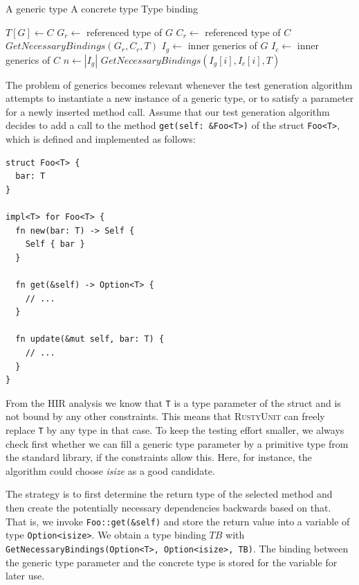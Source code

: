 \documentclass[paper=a4,%
  twoside,%
  BCOR4mm,%
  abstract=true,%
  toc=bibliography,%
  chapterprefix=true,%
  toc=bibliographynumbered,%
  open=right,%
  english,%
  pagesize=pdftex]{scrreprt}
\newcommand{\Desc}[2]{\State \makebox[2em][l]{#1}#2}
\newcommand{\tech}{\textsc{RustyUnit}\xspace}
\newcommand{\hir}{\ac{HIR}\xspace}
\begin{document}
\begin{algorithm}[t]
  \caption{$GetNecessaryBindings(G, C, T)$}\label{alg:get-necessary-bindings}
\begin{algorithmic}
\Input
  \Desc{$G$}{A generic type}
  \Desc{$C$}{A concrete type}
  \Desc{$T$}{Type binding}
\EndInput

\State $T[G] \gets C$
\Else
    \State $G_r \gets $ referenced type of $G$
    \State $C_r \gets $ referenced type of $C$
    \State $GetNecessaryBindings(G_r, C_r, T)$
  \Else
    \State $I_g \gets $ inner generics of $G$
    \State $I_c \gets $ inner generics of $C$
    \State $n \gets \left| I_g \right|$
      \State $GetNecessaryBindings(I_g[i], I_c[i], T)$
    \EndFor
  \EndIf
\EndIf
\end{algorithmic}
\end{algorithm}

The problem of generics becomes relevant whenever the test generation algorithm attempts to instantiate a new instance of a generic type, or to satisfy a parameter for a newly inserted method call. Assume that our test generation algorithm decides to add a call to the method \texttt{get(self: \&Foo<T>)} of the struct \texttt{Foo<T>}, which is defined and implemented as follows:
\begin{lstlisting}[style=boxed, caption={}, label=lst:basic-generics-example]
struct Foo<T> {
  bar: T
}

impl<T> for Foo<T> {
  fn new(bar: T) -> Self {
    Self { bar }
  }

  fn get(&self) -> Option<T> {
    // ...
  }

  fn update(&mut self, bar: T) {
    // ...
  }
}
\end{lstlisting}

From the \hir analysis we know that \texttt{T} is a type parameter of the struct and is not bound by any other constraints. This means that \tech can freely replace \texttt{T} by any type in that case. To keep the testing effort smaller, we always check first whether we can fill a generic type parameter by a primitive type from the standard library, if the constraints allow this. Here, for instance, the algorithm could choose \emph{isize} as a good candidate. 

The strategy is to first determine the return type of the selected method and then create the potentially necessary dependencies backwards based on that. That is, we invoke \texttt{Foo::get(\&self)} and store the return value into a variable of type \texttt{Option<isize>}. We obtain a type binding $TB$ with \texttt{GetNecessaryBindings(Option<T>, Option<isize>, TB)}. The binding \texttt{} between the generic type parameter and the concrete type is stored for the variable for later use.
\end{document}
